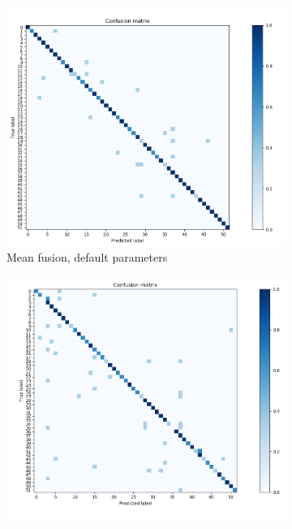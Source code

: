 \documentclass[10pt,technote]{IEEEtran}
\begin{document}
\begin{figure}
    \centering
    \begin{subfigure}[b]{0.3\textwidth}
        \includegraphics[width=\textwidth]{../results/ex2LDAEnsemble/conf_matrix_rand_mean.png}
        \caption{Mean fusion, default parameters}
    \end{subfigure}    
    \begin{subfigure}[b]{0.3\textwidth}
        \includegraphics[width=\textwidth]{../results/ex2LDAEnsemble/conf_matrix_rand.png}

\end{subfigure}
\end{figure}
\end{document}
